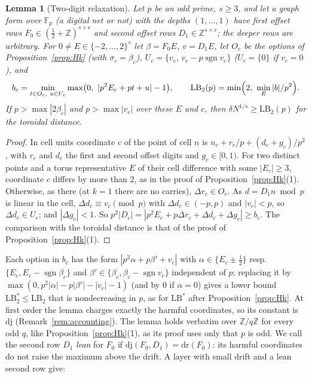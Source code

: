 \documentclass[11pt]{amsart}
\newtheorem{lemma}[theorem]{Lemma}
\theoremstyle{definition}
\theoremstyle{plain}
\newcommand{\Z}{\mathbb{Z}}
\newcommand{\F}{\mathbb{F}}
\begin{document}
\begin{lemma}[Two-digit relaxation]\label{lem:R2}
Let $p$ be an odd prime, $s\ge3$, and let a graph form over $\F_p$ (a digital net or not) with the depths $(1,\dots,1)$ have first offset rows $F_0\in(\frac12+\Z)^{s\times s}$ and second offset rows $D_1\in\Z^{s\times s}$; the deeper rows are arbitrary. For $0\ne E\in\{-2,\dots,2\}^s$ let $\beta=F_0E$, $v=D_1E$, let $O_c$ be the options of Proposition~\ref{prop:Hk} (with $\sigma_c=\beta_c$), $U_c=\{v_c,\,v_c-p\operatorname{sgn}v_c\}$ ($U_c=\{0\}$ if $v_c=0$), and
\[
b_c=\min_{t\in O_c,\ u\in U_c}\max\bigl(0,\ |p^2E_c+pt+u|-1\bigr),\qquad \mathrm{LB}_2(p)=\min\Bigl(2,\ \min_E|b|/p^2\Bigr).
\]
If $p>\max|2\beta_c|$ and $p>\max|v_c|$ over these $E$ and $c$, then $\delta N^{1/s}\ge\mathrm{LB}_2(p)$ for the toroidal distance.
\end{lemma}

\begin{proof}
In cell units coordinate $c$ of the point of cell $n$ is $n_c+r_c/p+(d_c+g_c)/p^2$, with $r_c$ and $d_c$ the first and second offset digits and $g_c\in[0,1)$. For two distinct points and a torus representative $E$ of their cell difference with some $|E_c|\ge3$, coordinate $c$ differs by more than $2$, as in the proof of Proposition~\ref{prop:Hk}(1). Otherwise, as there (at $k=1$ there are no carries), $\Delta r_c\in O_c$. As $d=D_1n\bmod p$ is linear in the cell, $\Delta d_c\equiv v_c\pmod p$ with $\Delta d_c\in(-p,p)$ and $|v_c|<p$, so $\Delta d_c\in U_c$; and $|\Delta g_c|<1$. So $p^2|D_c|=|p^2E_c+p\Delta r_c+\Delta d_c+\Delta g_c|\ge b_c$. The comparison with the toroidal distance is that of the proof of Proposition~\ref{prop:Hk}(1).
\end{proof}

Each option in $b_c$ has the form $|p^2\alpha+p\beta'+v_c|$ with $\alpha\in\{E_c\pm\frac12\}$ resp.\ $\{E_c,E_c-\operatorname{sgn}\beta_c\}$ and $\beta'\in\{\beta_c,\beta_c-\operatorname{sgn}v_c\}$ independent of $p$; replacing it by $\max(0,p^2|\alpha|-p|\beta'|-|v_c|-1)$ (and by $0$ if $\alpha=0$) gives a lower bound $\mathrm{LB}_2^*\le\mathrm{LB}_2$ that is nondecreasing in $p$, as for $\mathrm{LB}^*$ after Proposition~\ref{prop:Hk}. At first order the lemma charges exactly the harmful coordinates, so its constant is $\mathrm{dj}$ (Remark~\ref{rem:accounting}). The lemma holds verbatim over $\Z/q\Z$ for every odd $q$, like Proposition~\ref{prop:Hk}(1), as its proof uses only that $p$ is odd. We call the second row $D_1$ \emph{lean} for $F_0$ if $\mathrm{dj}(F_0,D_1)=\mathrm{dr}(F_0)$: its harmful coordinates do not raise the maximum above the drift. A layer with small drift and a lean second row give:
\end{document}
